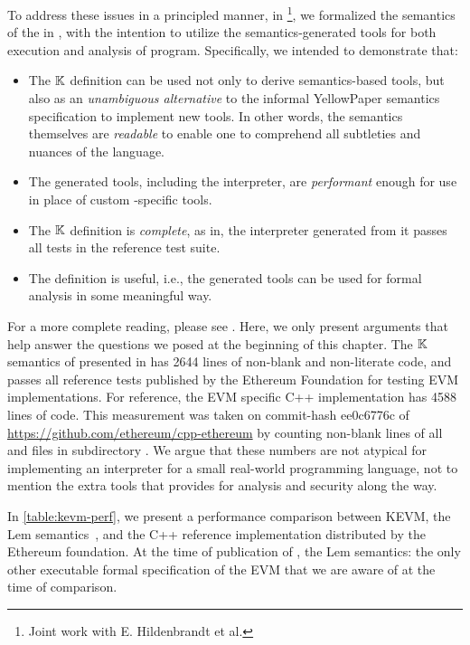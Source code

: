 To address these issues in a principled manner, in \cite{HildenbrandtCSF18}
\footnote{Joint work with E. Hildenbrandt et al.},
we formalized the semantics of the \EVM{} in \K{}, with the intention to
utilize the semantics-generated tools for both execution and analysis of \KEVM{}
program. Specifically, we intended to demonstrate that:

\begin{itemize}
  \item The $\mathbb{K}$ definition can be used not only to derive semantics-based
  tools, but also as an \emph{unambiguous alternative} to the
  informal YellowPaper semantics specification to implement new tools. In other
  words, the semantics themselves are \emph{readable} to enable one to
  comprehend all subtleties and nuances of the language.
  \item The generated tools, including the interpreter, are \emph{performant}
  enough for use in place of custom \EVM{}-specific tools.
  \item  The $\mathbb{K}$ definition is \emph{complete}, as in, the interpreter
  generated from it passes all tests in the reference test suite.
  \item The definition is useful, i.e., the generated tools can be used for
  formal analysis in some meaningful way.
\end{itemize}

For a more complete reading, please see
\cite{HildenbrandtCSF18}. Here, we only present arguments that
help answer the questions we posed at the beginning of this chapter.
The $\mathbb{K}{}$ semantics of \EVM{} presented in \cite{HildenbrandtCSF18}
has 2644 lines of non-blank and non-literate code, and passes
all reference tests published by the Ethereum Foundation for testing
EVM implementations. For reference,
the EVM specific C++ implementation has 4588 lines of code.
This measurement was taken on commit-hash ee0c6776c of
\url{https://github.com/ethereum/cpp-ethereum}
by counting non-blank lines of all  and  files
in subdirectory .
We argue that these numbers are not atypical for implementing an
interpreter for a small real-world programming language,
not to mention the extra tools that \K{} provides for analysis and security along the way.

In \autoref{table:kevm-perf}, we present a performance comparison between KEVM,
the Lem semantics~\cite{HiraiWSTC17},
and the C++ reference implementation distributed by the Ethereum foundation.
At the time of publication of \cite{HildenbrandtCSF18}, the Lem semantics:
the only other executable formal specification of the EVM that we are aware of
at the time of comparison.

